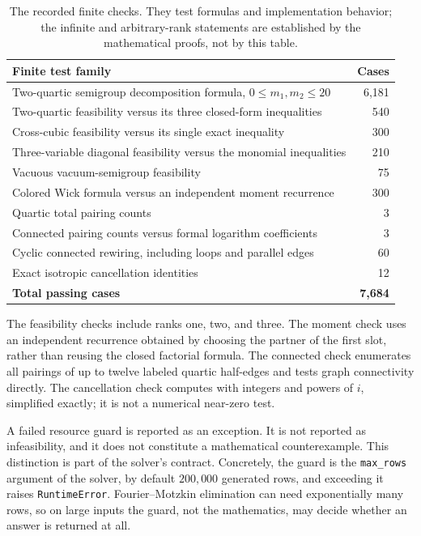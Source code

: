 \documentclass[11pt,letterpaper]{article}
\numberwithin{equation}{section}
\theoremstyle{definition}
\theoremstyle{remark}
\begin{document}
\begin{table}[ht]
\centering\small
\begin{tabularx}{\textwidth}{Y r}
\toprule
Finite test family & Cases\\
\midrule
Two-quartic semigroup decomposition formula, $0\le m_1,m_2\le20$ & 6,181\\
Two-quartic feasibility versus its three closed-form inequalities & 540\\
Cross-cubic feasibility versus its single exact inequality & 300\\
Three-variable diagonal feasibility versus the monomial inequalities & 210\\
Vacuous vacuum-semigroup feasibility & 75\\
Colored Wick formula versus an independent moment recurrence & 300\\
Quartic total pairing counts & 3\\
Connected pairing counts versus formal logarithm coefficients & 3\\
Cyclic connected rewiring, including loops and parallel edges & 60\\
Exact isotropic cancellation identities & 12\\
\midrule
\textbf{Total passing cases} & \textbf{7,684}\\
\bottomrule
\end{tabularx}
\caption{The recorded finite checks. They test formulas and implementation
behavior; the infinite and arbitrary-rank statements are established by
the mathematical proofs, not by this table.}
\label{wick:tab:checks}
\end{table}

The feasibility checks include ranks one, two, and three. The moment check
uses an independent recurrence obtained by choosing the partner of the first
slot, rather than reusing the closed factorial formula. The connected check
enumerates all pairings of up to twelve labeled quartic half-edges and tests
graph connectivity directly. The cancellation check computes with integers
and powers of $i$, simplified exactly; it is not a numerical near-zero test.

A failed resource guard is reported as an exception. It is not reported as
infeasibility, and it does not constitute a mathematical counterexample.
This distinction is part of the solver's contract. Concretely, the guard is
the \texttt{max\_rows} argument of the solver, by default $200{,}000$
generated rows, and exceeding it raises \texttt{RuntimeError}. Fourier--Motzkin
elimination can need exponentially many rows, so on large inputs the guard,
not the mathematics, may decide whether an answer is returned at all.
\end{document}
